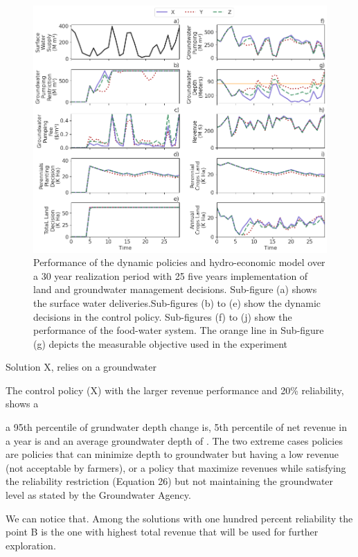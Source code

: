 \documentclass[11pt,a4paper]{article}
\begin{document}
\begin{figure}[H]
    \centering
    \includegraphics[width=1\textwidth]{selected_policies_performance.png}
    \caption{Performance of the dynamic policies and hydro-economic model over a 30 year realization period with 25 five years implementation of land and groundwater management decisions. Sub-figure (a) shows the surface water deliveries.Sub-figures (b) to (e) show the dynamic decisions in the control policy. Sub-figures (f) to (j) show the performance of the food-water system. The orange line in Sub-figure (g) depicts the measurable objective used in the experiment} \label{fig:parallel_robustness}
\end{figure}



Solution X, relies on a groundwater 


The control policy (X) with the larger revenue performance and 20\% reliability, shows a


a 95th percentile of grundwater depth change is,  5th percentile of net revenue in a year is and an average groundwater depth of .  The two extreme cases policies are policies that can minimize depth to groundwater but having a low revenue (not acceptable by farmers), or a policy that maximize revenues while satisfying the reliability restriction (Equation 26) but not maintaining the groundwater level as stated by the Groundwater Agency.

We can notice that. Among the solutions with one hundred percent reliability the point B is the one with highest total revenue that will be used for further exploration. 
\end{document}

